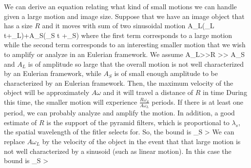 \documentclass[letterpaper, 10pt]{article}
\numberwithin{equation}{section}
\begin{document}
We can derive an equation relating what kind of small motions we can handle given a large motion and image size. Suppose that we have an image object that has a size $R$ and it moves with sum of two sinusoidal motion 
\beq A_L\cos(\omega_L t+\phi_L)+A_S\cos(\omega_S t +\phi_S) \eeq
where the first term corresponds to a large motion while the second term corresponds to an interesting smaller motion that we wish to amplify or analyze in an Eulerian framework. We assume 
\beq A_L>>R >> A_S \eeq 
and $A_L$ is of amplitude so large that the overall motion is not well characterized by an Eulerian framework, while $A_S$ is of small enough amplitude to be characterized by an Eulerian framework. Then, the maximum velocity of the object will be approximately $A\omega$ and it will travel a distance of $R$ in time 
\beq {}\eeq
During this time, the smaller motion will experience $\frac{R\omega_S}{A\omega_L}$ periods. If there is at least one period, we can probably analyze and amplify the motion. In addition, a good estimate of $R$ is the support of the pyramid filters, which is proportional to $\lambda_s$, the spatial wavelength of the fitler selects for. So, the bound is 
\beq \omega_S > \eeq
We can replace $A\omega_L$ by the velocity of the object in the event that that large motion is not well characterized by a sinusoid (such as linear motion). In this case the bound is 
\beq \omega_S > \eeq
\end{document}
